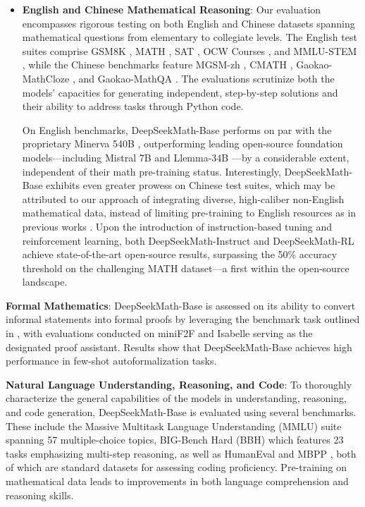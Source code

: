 \begin{itemize}[topsep=0pt]
    \item \textbf{English and Chinese Mathematical Reasoning}: Our evaluation encompasses rigorous testing on both English and Chinese datasets spanning mathematical questions from elementary to collegiate levels. The English test suites comprise GSM8K \citep{gsm8k}, MATH \citep{MATH}, SAT \citep{llemma}, OCW Courses \citep{minerva}, and MMLU-STEM \citep{mmlu}, while the Chinese benchmarks feature MGSM-zh \citep{mgsm}, CMATH \citep{wei2023cmath}, Gaokao-MathCloze \citep{agieval}, and Gaokao-MathQA \citep{agieval}. The evaluations scrutinize both the models' capacities for generating independent, step-by-step solutions and their ability to address tasks through Python code.

    On English benchmarks, DeepSeekMath-Base performs on par with the proprietary Minerva 540B \citep{minerva}, outperforming leading open-source foundation models—including Mistral 7B \citep{mistral} and Llemma-34B \citep{llemma}—by a considerable extent, independent of their math pre-training status. Interestingly, DeepSeekMath-Base exhibits even greater prowess on Chinese test suites, which may be attributed to our approach of integrating diverse, high-caliber non-English mathematical data, instead of limiting pre-training to English resources as in previous works \citep{minerva,llemma}. Upon the introduction of instruction-based tuning and reinforcement learning, both DeepSeekMath-Instruct and DeepSeekMath-RL achieve state-of-the-art open-source results, surpassing the 50\% accuracy threshold on the challenging MATH dataset—a first within the open-source landscape.
\end{itemize}

\item \textbf{Formal Mathematics}: DeepSeekMath-Base is assessed on its ability to convert informal statements into formal proofs by leveraging the benchmark task outlined in \citep{dsp_proof}, with evaluations conducted on miniF2F \citep{minif2f} and Isabelle \citep{isabelle} serving as the designated proof assistant. Results show that DeepSeekMath-Base achieves high performance in few-shot autoformalization tasks.

\item \textbf{Natural Language Understanding, Reasoning, and Code}: To thoroughly characterize the general capabilities of the models in understanding, reasoning, and code generation, DeepSeekMath-Base is evaluated using several benchmarks. These include the Massive Multitask Language Understanding (MMLU) suite \citep{mmlu} spanning 57 multiple-choice topics, BIG-Bench Hard (BBH) \citep{bbh} which features 23 tasks emphasizing multi-step reasoning, as well as HumanEval \citep{codex} and MBPP \citep{mbpp}, both of which are standard datasets for assessing coding proficiency. Pre-training on mathematical data leads to improvements in both language comprehension and reasoning skills.

